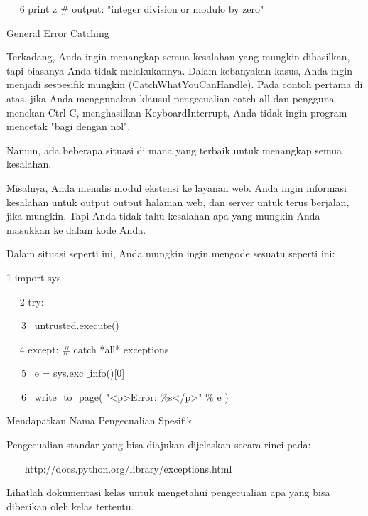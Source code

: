 ~~ 6 print z  $  \#  $ output: "integer division or modulo by zero" \par
\vspace{12pt}
General Error Catching \par
\vspace{12pt}
Terkadang, Anda ingin menangkap semua kesalahan yang mungkin dihasilkan, tapi biasanya Anda tidak melakukannya. Dalam kebanyakan kasus, Anda ingin menjadi sespesifik mungkin (CatchWhatYouCanHandle). Pada contoh pertama di atas, jika Anda menggunakan klausul pengecualian catch-all dan pengguna menekan Ctrl-C, menghasilkan KeyboardInterrupt, Anda tidak ingin program mencetak "bagi dengan nol". \par
\vspace{12pt}
Namun, ada beberapa situasi di mana yang terbaik untuk menangkap semua kesalahan. \par
\vspace{12pt}
Misalnya, Anda menulis modul ekstensi ke layanan web. Anda ingin informasi kesalahan untuk output output halaman web, dan server untuk terus berjalan, jika mungkin. Tapi Anda tidak tahu kesalahan apa yang mungkin Anda masukkan ke dalam kode Anda. \par
\vspace{12pt}
Dalam situasi seperti ini, Anda mungkin ingin mengode sesuatu seperti ini: \par
\vspace{12pt}
 1 import sys \par
~~ 2 try: \par
~~~3~  untrusted.execute() \par
~~ 4 except:  $  \#  $ catch *all* exceptions \par
~~~5~  e = sys.exc $  \_  $info()[0] \par
~~~6~  write $  \_  $to $  \_  $page( "<p>Error:  $  \%  $s</p>"  $  \%  $ e ) \par
\vspace{12pt}
Mendapatkan Nama Pengecualian Spesifik \par
\vspace{12pt}
Pengecualian standar yang bisa diajukan dijelaskan secara rinci pada: \par
\vspace{12pt}
~~~ http://docs.python.org/library/exceptions.html \par
\vspace{12pt}
Lihatlah dokumentasi kelas untuk mengetahui pengecualian apa yang bisa diberikan oleh kelas tertentu. \par

